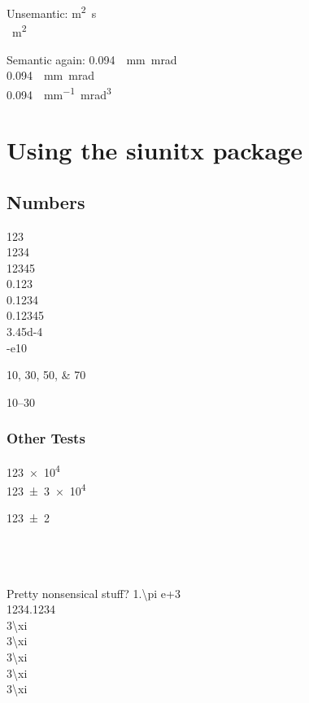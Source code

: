 \documentclass{article}
\begin{document}
Unsemantic:
\unit{m^2.s}\\
\unit{\mu m^2}

Semantic again:
\qty{0.094}{\pi . \milli\meter . \milli\radian}\\
\qty{0.094}{ . \milli\meter . \milli\radian}\\
\qty{0.094}{\pi \per \milli\meter . \milli\radian\tothe{3}}

\section{Using the siunitx package}

\subsection{Numbers}

\num{123}\\
\num{1234}\\
\num{12345}\\
\num{0.123}\\
\num{0,1234}\\
\num{.12345}\\
\num{3.45d-4}\\
\num{-e10}

\numlist{10;30;50;70}


\numrange{10}{30}

\subsubsection{Other Tests}

\num{123e4}\\
\num{123(3)e4}

\num{123\pm2}\\
\\
\\
\\

\def\dig{1234}
\def\odd{\xi}
\def\odder{\odd}

Pretty nonsensical stuff?
\num[parse-numbers=false]{1.\pi e+3}\\
\num{\dig.\dig}\\
\num[input-digits=\xi,parse-numbers=false]{3\xi}\\
\num[input-digits=\xi,parse-numbers=false]{3\odd}\\
\num[input-digits=\odd, parse-numbers=false]{3\odd}\\
\num[input-digits=\odd, parse-numbers=false]{3\odder}\\
\num[input-digits=\odder, parse-numbers=false]{3\odder}
\end{document}
